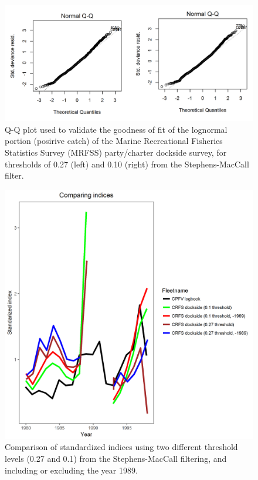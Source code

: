\documentclass[12pt,]{article}
\begin{document}
\begin{figure}[htbp]
\centering
\includegraphics{Figures/Fleet5_RecPC_dockside_QQ.png}
\caption{Q-Q plot used to validate the goodness of fit of the lognormal
portion (posirive catch) of the Marine Recreational Fisheries Statistics
Survey (MRFSS) party/charter dockside survey, for thresholds of 0.27
(left) and 0.10 (right) from the Stephens-MacCall filter.
\label{fig:Fleet5_RecPC_docksideQQ}}
\end{figure}

\FloatBarrier

\begin{figure}[htbp]
\centering
\includegraphics{Figures/Fleet5_RecPC_dockside_index_compare.png}
\caption{Comparison of standardized indices using two different
threshold levels (0.27 and 0.1) from the Stephens-MacCall filtering, and
including or excluding the year 1989.
\label{fig:Fleet5_RecPC_dockside_index_compare}}
\end{figure}
\end{document}

